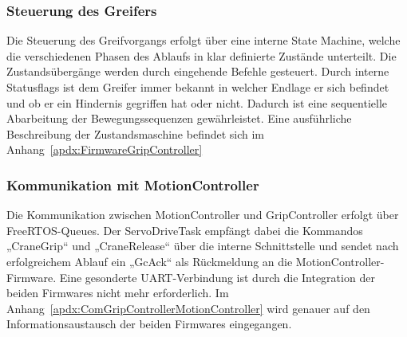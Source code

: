 \documentclass[main.tex]{subfiles} %
\begin{document}
\subsubsection{Steuerung des Greifers}
Die Steuerung des Greifvorgangs erfolgt über eine interne State Machine, welche die verschiedenen Phasen des
Ablaufs in klar definierte Zustände unterteilt. Die Zustandsübergänge werden durch eingehende Befehle gesteuert.
Durch interne Statusflags ist dem Greifer immer bekannt in welcher Endlage er sich befindet und ob er ein Hindernis
gegriffen hat oder nicht. Dadurch ist eine sequentielle Abarbeitung der Bewegungssequenzen gewährleistet. Eine
ausführliche Beschreibung der Zustandsmaschine befindet sich im Anhang~\ref{apdx:FirmwareGripController}



\subsubsection{Kommunikation mit MotionController}
Die Kommunikation zwischen MotionController und GripController erfolgt über FreeRTOS-Queues. Der ServoDriveTask empfängt
dabei die Kommandos „CraneGrip“ und „CraneRelease“ über die interne Schnittstelle und sendet nach erfolgreichem Ablauf ein
„GcAck“ als Rückmeldung an die MotionController-Firmware. Eine gesonderte UART-Verbindung ist durch die Integration der
beiden Firmwares nicht mehr erforderlich. Im Anhang~\ref{apdx:ComGripControllerMotionController} wird genauer auf den Informationsaustausch der beiden Firmwares
eingegangen.
\end{document}

